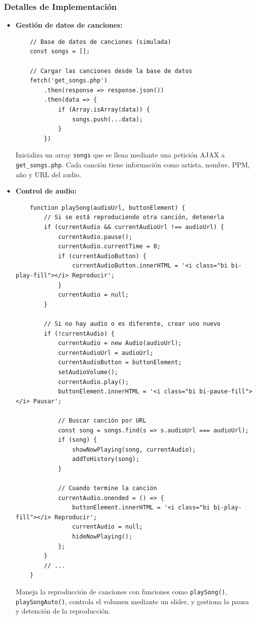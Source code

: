 \documentclass[a4paper,12pt]{article}
\begin{document}
\subsubsection{Detalles de Implementación}
\begin{itemize}
    \item \textbf{Gestión de datos de canciones:}
    \begin{verbatim}
    // Base de datos de canciones (simulada)
    const songs = [];
    
    // Cargar las canciones desde la base de datos
    fetch('get_songs.php')
        .then(response => response.json())
        .then(data => {
            if (Array.isArray(data)) {
                songs.push(...data);
            }
        })
    \end{verbatim}
    Inicializa un array \texttt{songs} que se llena mediante una petición AJAX a \texttt{get\_songs.php}. Cada canción tiene información como artista, nombre, PPM, año y URL del audio.

    \item \textbf{Control de audio:}
    \begin{verbatim}
    function playSong(audioUrl, buttonElement) {
        // Si se está reproduciendo otra canción, detenerla
        if (currentAudio && currentAudioUrl !== audioUrl) {
            currentAudio.pause();
            currentAudio.currentTime = 0;
            if (currentAudioButton) {
                currentAudioButton.innerHTML = '<i class="bi bi-play-fill"></i> Reproducir';
            }
            currentAudio = null;
        }
        
        // Si no hay audio o es diferente, crear uno nuevo
        if (!currentAudio) {
            currentAudio = new Audio(audioUrl);
            currentAudioUrl = audioUrl;
            currentAudioButton = buttonElement;
            setAudioVolume();
            currentAudio.play();
            buttonElement.innerHTML = '<i class="bi bi-pause-fill"></i> Pausar';
            
            // Buscar canción por URL
            const song = songs.find(s => s.audioUrl === audioUrl);
            if (song) {
                showNowPlaying(song, currentAudio);
                addToHistory(song);
            }
            
            // Cuando termine la canción
            currentAudio.onended = () => {
                buttonElement.innerHTML = '<i class="bi bi-play-fill"></i> Reproducir';
                currentAudio = null;
                hideNowPlaying();
            };
        } 
        // ...
    }
    \end{verbatim}
    Maneja la reproducción de canciones con funciones como \texttt{playSong()}, \texttt{playSongAuto()}, controla el volumen mediante un slider, y gestiona la pausa y detención de la reproducción.


\end{itemize}
\end{document}
